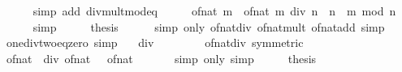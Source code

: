 \begin{isabellebody}
\ \ \ \ \isamarkupfalse%
\ {\isacharparenleft}{\kern0pt}simp\ add{\isacharcolon}{\kern0pt}\ div{\isacharunderscore}{\kern0pt}mult{\isacharunderscore}{\kern0pt}mod{\isacharunderscore}{\kern0pt}eq{\isacharparenright}{\kern0pt}\isanewline
\ \ \isamarkupfalse%
\ \isamarkupfalse%
\ {\isachardoublequoteopen}of{\isacharunderscore}{\kern0pt}nat\ m\ {\isacharequal}{\kern0pt}\ of{\isacharunderscore}{\kern0pt}nat\ {\isacharparenleft}{\kern0pt}m\ div\ n\ {\isacharasterisk}{\kern0pt}\ n\ {\isacharplus}{\kern0pt}\ m\ mod\ n{\isacharparenright}{\kern0pt}{\isachardoublequoteclose}\isanewline
\ \ \ \ \isamarkupfalse%
\ simp\isanewline
\ \ \isamarkupfalse%
\ \isamarkupfalse%
\ {\isacharquery}{\kern0pt}thesis\isanewline
\ \ \ \ \isamarkupfalse%
\ {\isacharparenleft}{\kern0pt}simp\ only{\isacharcolon}{\kern0pt}\ of{\isacharunderscore}{\kern0pt}nat{\isacharunderscore}{\kern0pt}div\ of{\isacharunderscore}{\kern0pt}nat{\isacharunderscore}{\kern0pt}mult\ of{\isacharunderscore}{\kern0pt}nat{\isacharunderscore}{\kern0pt}add{\isacharparenright}{\kern0pt}\ simp\isanewline
{}\isamarkupfalse%
%
\endisatagproof
{\isafoldproof}%
%
\isadelimproof
\isanewline
%
\endisadelimproof
\isanewline
{}\isamarkupfalse%
\ one{\isacharunderscore}{\kern0pt}div{\isacharunderscore}{\kern0pt}two{\isacharunderscore}{\kern0pt}eq{\isacharunderscore}{\kern0pt}zero\ {\isacharbrackleft}{\kern0pt}simp{\isacharbrackright}{\kern0pt}{\isacharcolon}{\kern0pt}\isanewline
\ \ {\isachardoublequoteopen}{}\ div\ {}\ {\isacharequal}{\kern0pt}\ {}{\isachardoublequoteclose}\isanewline
%
\isadelimproof
%
\endisadelimproof
%
\isatagproof
{}\isamarkupfalse%
\ {\isacharminus}{\kern0pt}\isanewline
\ \ \isamarkupfalse%
\ of{\isacharunderscore}{\kern0pt}nat{\isacharunderscore}{\kern0pt}div\ {\isacharbrackleft}{\kern0pt}symmetric{\isacharbrackright}{\kern0pt}\ \isamarkupfalse%
\ {\isachardoublequoteopen}of{\isacharunderscore}{\kern0pt}nat\ {}\ div\ of{\isacharunderscore}{\kern0pt}nat\ {}\ {\isacharequal}{\kern0pt}\ of{\isacharunderscore}{\kern0pt}nat\ {}{\isachardoublequoteclose}\isanewline
\ \ \ \ \isamarkupfalse%
\ {\isacharparenleft}{\kern0pt}simp\ only{\isacharcolon}{\kern0pt}{\isacharparenright}{\kern0pt}\ simp\isanewline
\ \ \isamarkupfalse%
\ \isamarkupfalse%
\ {\isacharquery}{\kern0pt}thesis\isanewline
\ \ \ \ \isamarkupfalse%

\end{isabellebody}
